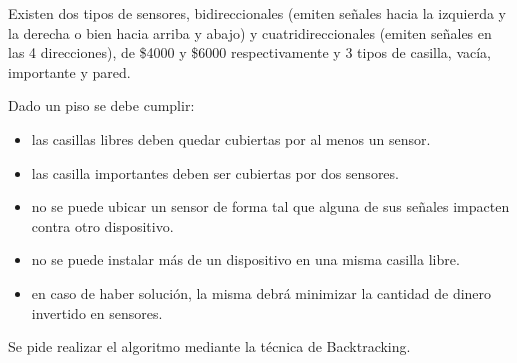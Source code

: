 \documentclass[a4paper, 10pt, twoside]{article}
\begin{document}
Existen dos tipos de sensores, bidireccionales (emiten señales hacia la izquierda y la derecha o bien hacia arriba y abajo) y cuatridireccionales (emiten señales en las 4 direcciones), de \$4000 y \$6000 respectivamente y 3 tipos de casilla, vacía, importante y pared.

Dado un piso se debe cumplir:

\begin{itemize}
\item las casillas libres deben quedar cubiertas por al menos un sensor.
\item las casilla importantes deben ser cubiertas por dos sensores.
\item no se puede ubicar un sensor de forma tal que alguna de sus señales impacten contra otro dispositivo.
\item no se puede instalar más de un dispositivo en una misma casilla libre.
\item en caso de haber solución, la misma debrá minimizar la cantidad de dinero invertido en sensores.
\end{itemize}

Se pide realizar el algoritmo mediante la técnica de Backtracking.
\end{document}

